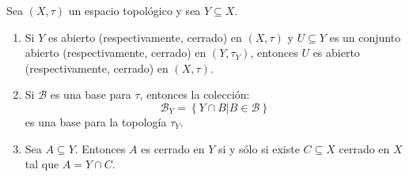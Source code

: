 \documentclass[12pt]{report}
\theoremstyle{largebreak}
\begin{document}
    \begin{propo}
        Sea $(X,\tau)$ un espacio topológico y sea $Y\subseteq X$.
        \begin{enumerate}
            \item Si $Y$ es abierto (respectivamente, cerrado) en $(X,\tau)$ y $U\subseteq Y$ es un conjunto abierto (respectivamente, cerrado) en $(Y,\tau_Y)$, entonces $U$ es abierto (respectivamente, cerrado) en $(X,\tau)$.
            \item Si $\mathcal{B}$ es una base para $\tau$, entonces la colección:
            \begin{equation*}
                \mathcal{B}_Y=\left\{Y\cap B\Big| B\in\mathcal{B} \right\}
            \end{equation*}
            es una base para la topología $\tau_Y$.
            \item Sea $A\subseteq Y$. Entonces $A$ es cerrado en $Y$ si y sólo si existe $C\subseteq X$ cerrado en $X$ tal que $A=Y\cap C$.
        \end{enumerate}
    \end{propo}
\end{document}

